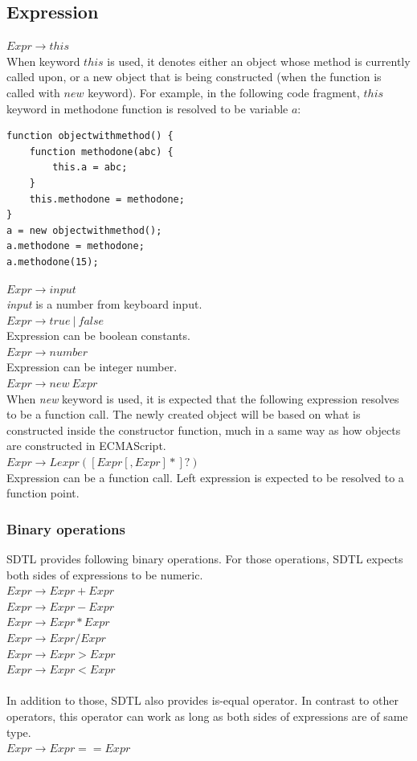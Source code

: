 \documentclass[a4paper,12pt]{article}
\begin{document}
\subsection{Expression}
$Expr \rightarrow this$\\
When keyword $this$ is used, it denotes either an object whose method is currently called upon, or a new object that is being constructed (when the function is called with $new$ keyword). For example, in the following code fragment, $this$ keyword in methodone function is resolved to be variable $a$:\\
\begin{lstlisting}[caption=this]
function objectwithmethod() {
	function methodone(abc) {
		this.a = abc;
	}
	this.methodone = methodone;
}
a = new objectwithmethod();
a.methodone = methodone;
a.methodone(15);
\end{lstlisting}
$Expr \rightarrow input$\\
\textit{input} is a number from keyboard input.\\
$Expr \rightarrow true\ |\ false$\\
Expression can be boolean constants.\\
$Expr \rightarrow number$\\
Expression can be integer number.\\
$Expr \rightarrow new\  Expr$\\
When \textit{new} keyword is used, it is expected that the following expression resolves to be a function call. The newly created object will be based on what is constructed inside the constructor function, much in a same way as how objects are constructed in ECMAScript.\\
$Expr \rightarrow Lexpr ([Expr[,Expr]*]?)$\\
Expression can be a function call. Left expression is expected to be resolved to a function point.\\
\subsubsection{Binary operations}
SDTL provides following binary operations. For those operations, SDTL expects both sides of expressions to be numeric.\\
$Expr \rightarrow Expr + Expr$\\
$Expr \rightarrow Expr - Expr$\\
$Expr \rightarrow Expr * Expr$\\
$Expr \rightarrow Expr / Expr$\\
$Expr \rightarrow Expr > Expr$\\
$Expr \rightarrow Expr < Expr$\\
\\
In addition to those, SDTL also provides is-equal operator. In contrast to other operators, this operator can work as long as both sides of expressions are of same type.\\
$Expr \rightarrow Expr == Expr$\\
\end{document}
